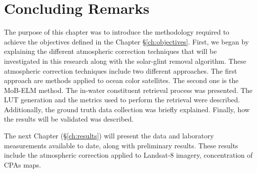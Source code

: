 \section{Concluding Remarks}
The purpose of this chapter was to introduce the methodology required to achieve the objectives defined in the Chapter \S\ref{ch:objectives}. First, we began by explaining the different atmospheric correction techniques that will be investigated in this research along with the solar-glint removal algorithm. These atmospheric correction techniques include two different approaches. The first approach are methods applied to ocean color satellites. The second one is the MoB-ELM method. The in-water constituent retrieval process was presented. The LUT generation and the metrics used to perform the retrieval were described. Additionally, the ground truth data collection was briefly explained. Finally, how the results will be validated was described. 

The next Chapter (\S\ref{ch:results}) will present the data and laboratory measurements available to date, along with preliminary results. These results include the atmospheric correction applied to Landsat-8 imagery, concentration of CPAs maps.


